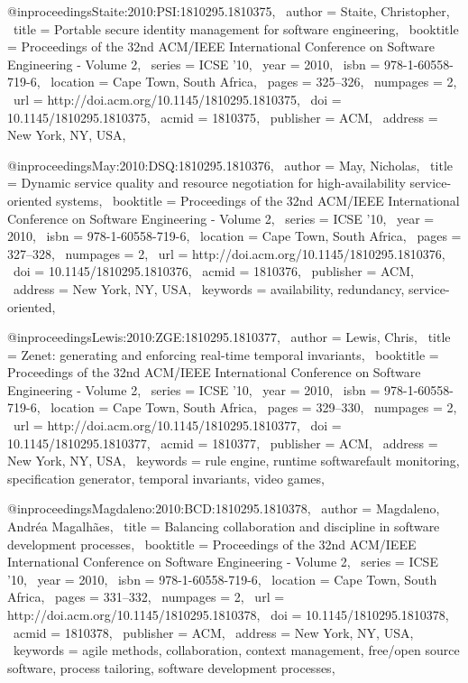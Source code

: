 @inproceedings{Staite:2010:PSI:1810295.1810375,
 author = {Staite, Christopher},
 title = {Portable secure identity management for software engineering},
 booktitle = {Proceedings of the 32nd ACM/IEEE International Conference on Software Engineering - Volume 2},
 series = {ICSE '10},
 year = {2010},
 isbn = {978-1-60558-719-6},
 location = {Cape Town, South Africa},
 pages = {325--326},
 numpages = {2},
 url = {http://doi.acm.org/10.1145/1810295.1810375},
 doi = {10.1145/1810295.1810375},
 acmid = {1810375},
 publisher = {ACM},
 address = {New York, NY, USA},
} 

@inproceedings{May:2010:DSQ:1810295.1810376,
 author = {May, Nicholas},
 title = {Dynamic service quality and resource negotiation for high-availability service-oriented systems},
 booktitle = {Proceedings of the 32nd ACM/IEEE International Conference on Software Engineering - Volume 2},
 series = {ICSE '10},
 year = {2010},
 isbn = {978-1-60558-719-6},
 location = {Cape Town, South Africa},
 pages = {327--328},
 numpages = {2},
 url = {http://doi.acm.org/10.1145/1810295.1810376},
 doi = {10.1145/1810295.1810376},
 acmid = {1810376},
 publisher = {ACM},
 address = {New York, NY, USA},
 keywords = {availability, redundancy, service-oriented},
} 

@inproceedings{Lewis:2010:ZGE:1810295.1810377,
 author = {Lewis, Chris},
 title = {Zenet: generating and enforcing real-time temporal invariants},
 booktitle = {Proceedings of the 32nd ACM/IEEE International Conference on Software Engineering - Volume 2},
 series = {ICSE '10},
 year = {2010},
 isbn = {978-1-60558-719-6},
 location = {Cape Town, South Africa},
 pages = {329--330},
 numpages = {2},
 url = {http://doi.acm.org/10.1145/1810295.1810377},
 doi = {10.1145/1810295.1810377},
 acmid = {1810377},
 publisher = {ACM},
 address = {New York, NY, USA},
 keywords = {rule engine, runtime softwarefault monitoring, specification generator, temporal invariants, video games},
} 

@inproceedings{Magdaleno:2010:BCD:1810295.1810378,
 author = {Magdaleno, Andr{\'e}a Magalh\~{a}es},
 title = {Balancing collaboration and discipline in software development processes},
 booktitle = {Proceedings of the 32nd ACM/IEEE International Conference on Software Engineering - Volume 2},
 series = {ICSE '10},
 year = {2010},
 isbn = {978-1-60558-719-6},
 location = {Cape Town, South Africa},
 pages = {331--332},
 numpages = {2},
 url = {http://doi.acm.org/10.1145/1810295.1810378},
 doi = {10.1145/1810295.1810378},
 acmid = {1810378},
 publisher = {ACM},
 address = {New York, NY, USA},
 keywords = {agile methods, collaboration, context management, free/open source software, process tailoring, software development processes},
} 

